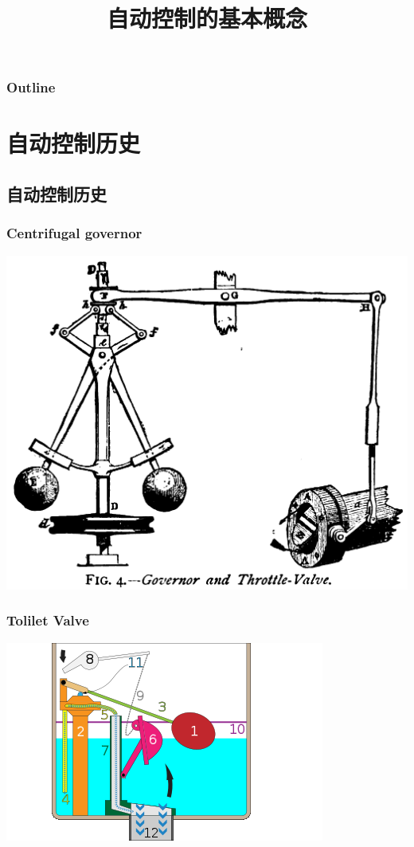 \documentclass{article}
\title{自动控制的基本概念}
\author{}
\date{}
\begin{document}
\maketitle

\begin{frame}
\frametitle{Outline}
\setcounter{tocdepth}{3}
\tableofcontents
\end{frame}










\section{自动控制历史}
\label{sec-1}
\subsection{自动控制历史}
\label{sec-1-1}
\begin{frame}
\frametitle{Centrifugal governor}
\label{sec-1-1-1}

\includegraphics[width=\textwidth]{image/centrifugal_governor.png}
\end{frame}
\begin{frame}
\frametitle{Tolilet Valve}
\label{sec-1-1-2}

\includegraphics[width=\textwidth]{image/250px-Gravity_toilet_valves_handle_down.svg.png}
\end{frame}
\end{document}
